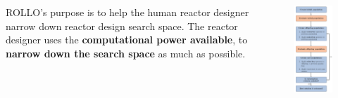 \begin{frame}
\begin{columns}
\begin{column}{0.7\textwidth}
            \vspace{0.2cm}
            ROLLO's purpose is to help the human reactor designer narrow down reactor design 
            search space. The reactor designer uses the \textbf{computational power 
            available}, to \textbf{narrow down the search space} as much as possible.
        \end{column}
        \begin{column}{0.3\textwidth}
            \begin{figure}
                \includegraphics[width=0.9\linewidth]{figures/rollo-flow2.png} 
            \end{figure}
        \end{column}
    \end{columns}
\end{frame}
